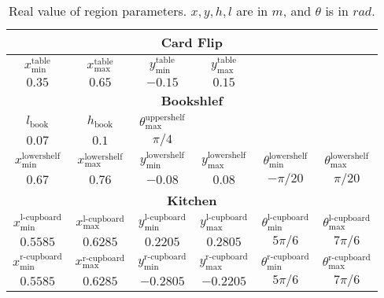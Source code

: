 \begin{table}[H]
\centering
\setlength\tabcolsep{20 pt}
\renewcommand{\arraystretch}{1.3}
\caption{Real value of region parameters. $x, y, h, l$ are in $m$, and $\theta$ is in $rad$.}\label{table:region_params}
\begin{tabular}{|c|c|c|c|c|c|}
\hline
\multicolumn{6}{|c|}{\textbf{Card Flip}} \\ 
\hline
$x^{\text{table}}_{\text{min}}$ & $x^{\text{table}}_{\text{max}}$ & $y^{\text{table}}_{\text{min}}$ & $y^{\text{table}}_{\text{max}}$ &  & \\
\hline
$0.35$ & $0.65$ & $-0.15$ & $0.15$ &  & \\
\hline
\multicolumn{6}{|c|}{\textbf{Bookshlef}} \\ 
\hline
$l_{\text{book}}$ & $h_{\text{book}}$ & $\theta^{\text{uppershelf}}_{\text{max}}$ & & & \\
\hline
$0.07$ & $0.1$ & $\pi/4$ & $ $ & $ $ & $ $ \\
\hline
$x^{\text{lowershelf}}_{\text{min}}$ & $x^{\text{lowershelf}}_{\text{max}}$ & $y^{\text{lowershelf}}_{\text{min}}$ & $y^{\text{lowershelf}}_{\text{max}}$ & $\theta^{\text{lowershelf}}_{\text{min}}$ & $\theta^{\text{lowershelf}}_{\text{max}}$ \\
\hline
$0.67$ & $0.76$ & $-0.08$ & $0.08$ & $-\pi/20$ & $\pi/20$ \\
\hline
\multicolumn{6}{|c|}{\textbf{Kitchen}} \\ 
\hline
$x^{\text{l-cupboard}}_{\text{min}}$ & $x^{\text{l-cupboard}}_{\text{max}}$ & $y^{\text{l-cupboard}}_{\text{min}}$ & $y^{\text{l-cupboard}}_{\text{max}}$ & $\theta^{\text{l-cupboard}}_{\text{min}}$ & $\theta^{\text{l-cupboard}}_{\text{max}}$ \\
\hline
$0.5585$ & $0.6285$ & $0.2205$ & $0.2805$ & $5\pi/6$ & $7\pi/6$ \\
\hline
$x^{\text{r-cupboard}}_{\text{min}}$ & $x^{\text{r-cupboard}}_{\text{max}}$ & $y^{\text{r-cupboard}}_{\text{min}}$ & $y^{\text{r-cupboard}}_{\text{max}}$ & $\theta^{\text{r-cupboard}}_{\text{min}}$ & $\theta^{\text{r-cupboard}}_{\text{max}}$ \\
\hline
$0.5585$ & $0.6285$ & $-0.2805$ & $-0.2205$ & $5\pi/6$ & $7\pi/6$ \\
\hline
\end{tabular}
\end{table}
